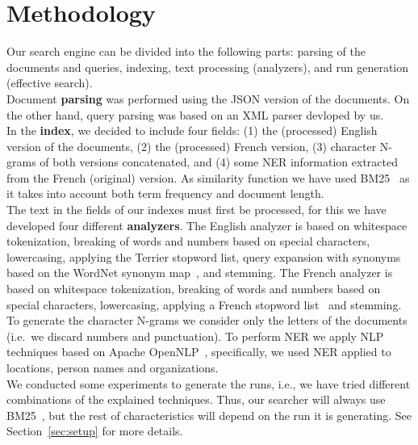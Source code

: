 \section{Methodology}
\label{sec:methodology}

Our search engine can be divided into the following parts: parsing of the documents and queries, indexing,
text processing (analyzers), and run generation (effective search).\\

Document \textbf{parsing} was performed using the JSON version of the documents.
On the other hand, query parsing was based on an XML parser devloped by us.\\

In the \textbf{index}, we decided to include four fields: (1) the (processed) English version of the documents, (2) the
(processed) French version, (3) character N-grams of both versions concatenated, and (4) some NER information extracted
from the French (original) version.
As similarity function we have used BM25~\cite{BM25} as it takes into account both term frequency and document length.\\

The text in the fields of our indexes must first be processed, for this we have developed four different \textbf{analyzers}.
The English analyzer is based on whitespace tokenization, breaking of words and numbers based on special characters,
lowercasing, applying the Terrier stopword list, query expansion with synonyms based on
the WordNet synonym map~\cite{wordnet}, and stemming.
The French analyzer is based on whitespace tokenization, breaking of words and numbers based on special characters,
lowercasing, applying a French stopword list~\cite{stopword_french} and stemming.
To generate the character N-grams we consider only the letters of the documents (i.e.\ we discard numbers and punctuation).
To perform NER we apply NLP techniques based on Apache OpenNLP~\cite{ApacheOpenNLP}, specifically, we used NER applied
to locations, person names and organizations.\\

We conducted some experiments to generate the runs, i.e., we have tried different combinations of the explained
techniques.
Thus, our searcher will always use BM25~\cite{BM25}, but the rest of characteristics will depend on the run it is
generating.
See Section~\ref{sec:setup} for more details.